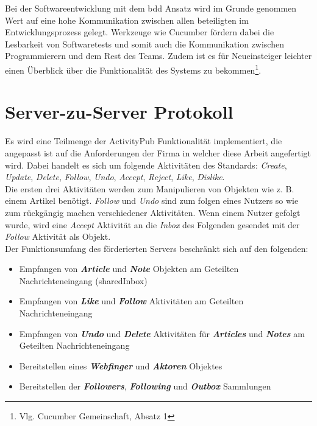 Bei der Softwareentwicklung mit dem \gls{bdd} Ansatz wird im Grunde genommen Wert auf eine hohe Kommunikation zwischen allen beteiligten im Entwicklungsprozess gelegt. Werkzeuge wie Cucumber fördern dabei die Lesbarkeit von Softwaretests und somit auch die Kommunikation zwischen Programmierern und dem Rest des Teams. Zudem ist es für Neueinsteiger leichter einen Überblick über die Funktionalität des Systems zu bekommen\footnote{Vlg. Cucumber Gemeinschaft, Absatz 1}.\\
 
\section{Server-zu-Server Protokoll}
Es wird eine Teilmenge der ActivityPub Funktionalität implementiert, die angepasst ist auf die Anforderungen der Firma in welcher diese Arbeit angefertigt wird. Dabei handelt es sich um folgende Aktivitäten des Standards: \textit{Create}, \textit{Update}, \textit{Delete}, \textit{Follow}, \textit{Undo}, \textit{Accept}, \textit{Reject}, \textit{Like}, \textit{Dislike}.\\

Die ersten drei Aktivitäten werden zum Manipulieren von Objekten wie z. B. einem Artikel benötigt. \textit{Follow} und \textit{Undo} sind zum folgen eines Nutzers so wie zum rückgängig machen verschiedener Aktivitäten. Wenn einem Nutzer gefolgt wurde, wird eine \textit{Accept} Aktivität an die \textit{Inbox} des Folgenden gesendet mit der \textit{Follow} Aktivität als Objekt.\\

Der Funktionsumfang des förderierten Servers beschränkt sich auf den folgenden:
\begin{itemize}
	\item Empfangen von \textit{\textbf{Article}} und \textit{\textbf{Note}} Objekten am Geteilten Nachrichteneingang (sharedInbox)
	\item Empfangen von \textit{\textbf{Like}} und \textit{\textbf{Follow}} Aktivitäten am Geteilten Nachrichteneingang
	\item Empfangen von \textit{\textbf{Undo}} und \textit{\textbf{Delete}} Aktivitäten für \textit{\textbf{Articles}} und \textit{\textbf{Notes}} am Geteilten Nachrichteneingang 
	\item Bereitstellen eines \textit{\textbf{Webfinger}} und \textit{\textbf{Aktoren}} Objektes
	\item Bereitstellen der \textit{\textbf{Followers}}, \textit{\textbf{Following}} und \textit{\textbf{Outbox}} Sammlungen
\end{itemize}

